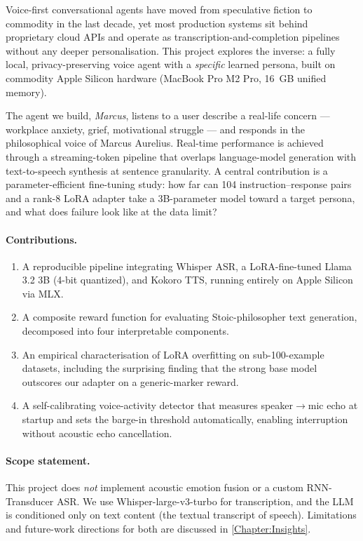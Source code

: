 \documentclass{ecsproject}
\begin{document}
Voice-first conversational agents have moved from speculative fiction
to commodity in the last decade, yet most production systems sit behind
proprietary cloud APIs and operate as transcription-and-completion
pipelines without any deeper personalisation. This project explores
the inverse: a fully local, privacy-preserving voice agent with a
\emph{specific} learned persona, built on commodity Apple Silicon
hardware (MacBook Pro M2 Pro, 16~GB unified memory).

The agent we build, \emph{Marcus}, listens to a user describe a
real-life concern --- workplace anxiety, grief, motivational struggle ---
and responds in the philosophical voice of Marcus Aurelius. Real-time
performance is achieved through a streaming-token pipeline that
overlaps language-model generation with text-to-speech synthesis at
sentence granularity. A central contribution is a parameter-efficient
fine-tuning study: how far can 104 instruction--response pairs and a
rank-8 LoRA adapter take a 3B-parameter model toward a target persona,
and what does failure look like at the data limit?

\paragraph{Contributions.}
\begin{enumerate}
    \item A reproducible pipeline integrating Whisper ASR, a
    LoRA-fine-tuned Llama 3.2 3B (4-bit quantized), and Kokoro TTS,
    running entirely on Apple Silicon via MLX.
    \item A composite reward function for evaluating Stoic-philosopher
    text generation, decomposed into four interpretable components.
    \item An empirical characterisation of LoRA overfitting on
    sub-100-example datasets, including the surprising finding that
    the strong base model outscores our adapter on a generic-marker
    reward.
    \item A self-calibrating voice-activity detector that measures
    speaker$\rightarrow$mic echo at startup and sets the barge-in
    threshold automatically, enabling interruption without acoustic
    echo cancellation.
\end{enumerate}

\paragraph{Scope statement.}
This project does \emph{not} implement acoustic emotion fusion or a
custom RNN-Transducer ASR. We use Whisper-large-v3-turbo
\citep{radford2022whisper} for transcription, and the LLM is
conditioned only on text content (the textual transcript of speech).
Limitations and future-work directions for both are discussed in
\cref{Chapter:Insights}.
\end{document}
